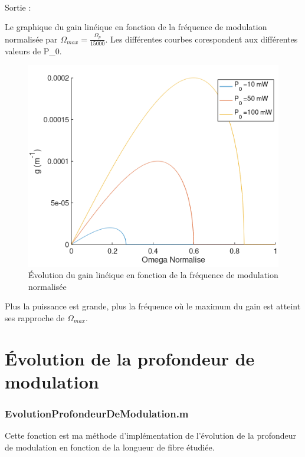 \documentclass[a4paper,12pt,titlepage]{article}
\begin{document}
             ~
             
             Sortie :
             
            Le graphique du gain linéique en fonction de la fréquence de modulation normalisée par $\Omega_{max} = \frac{\Omega_p}{15000}$. Les différentes courbes corespondent aux différentes valeurs de P\_0.
            
            \begin{figure}[h!]
                \centering
                \includegraphics{g(omega)}
                \caption{Évolution du gain linéique en fonction de la fréquence de modulation normalisée}
                \label{delta}
            \end{figure}
    
            Plus la puissance est grande, plus la fréquence où le maximum du gain est atteint ses rapproche de $\Omega_{max}$.
    
    \newpage
    
    \section{Évolution de la profondeur de modulation}
    
        \subsubsection*{EvolutionProfondeurDeModulation.m}
             Cette fonction est ma méthode d'implémentation de l'évolution de la profondeur de modulation en fonction de la longueur de fibre étudiée.
             
\end{document}
